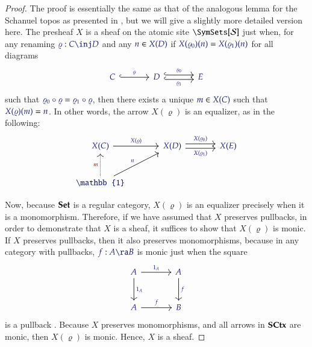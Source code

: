 \documentclass[11pt]{article}
\theoremstyle{definition}
\theoremstyle{remark}
\numberwithin{equation}{section}
\newcommand\SCtxSite{\SymSets[\Sorts]}
\begin{document}
\begin{proof}

  The proof is essentially the same as that of the analogous lemma for the
  Schanuel topos as presented in \cite[A.2.1.11.h]{johnstone:2002}, but we will
  give a slightly more detailed version here. The presheaf $X$ is a sheaf on the
  atomic site $\SCtxSite$ just when, for any renaming
  $\Of{\varrho}{C\inj D}$ and any $\Member{n}{X(D)}$ if
  $\IsEq{X(\varrho_0)(n)}{X(\varrho_1)(n)}$ for all diagrams
  \[
    \begin{tikzcd}[sep=large]
      \IMode{C} \arrow[r, hook, "\IMode{\varrho}"] &
      \IMode{D}
        \arrow[r, hook, shift left, "\IMode{\varrho_0}"]
        \arrow[r, hook, swap, shift right, "\IMode{\varrho_1}"]
      &
      \IMode{E}
    \end{tikzcd}
  \]
  such that $\IsEq{\varrho_0\circ\varrho}{\varrho_1\circ\varrho}$, then there
  exists a unique $\Member{m}{X(C)}$ such that $\IsEq{X(\varrho)(m)}{n}$. In other
  words, the arrow $X(\varrho)$ is an equalizer, as in the following:
  \[
    \begin{tikzcd}[sep=large]
      \IMode{X(C)} \arrow[r, "\IMode{X(\varrho)}"] &
      \IMode{X(D)}
        \arrow[r, shift left, "\IMode{X(\varrho_0)}"]
        \arrow[r, swap, shift right, "\IMode{X(\varrho_1)}"]&
      \IMode{X(E)}
      \\
      \IMode{\mathbb{1}}
        \arrow[u, densely dotted, "\OMode{m}"]
        \arrow[ur, "\IMode{n}"]
    \end{tikzcd}
  \]

  Now, because $\mathbf{Set}$ is a regular category, $X(\varrho)$ is an equalizer
  precisely when it is a monomorphism. Therefore, if we have assumed that $X$
  preserves pullbacks, in order to demonstrate that $X$ is a sheaf, it suffices
  to show that $X(\varrho)$ is monic. If $X$ preserves pullbacks, then it also
  preserves monomorphisms, because in any category with pullbacks, $\Of{f}{A\ra
  B}$ is monic just when the square
  \[
    \begin{tikzcd}[sep=large]
      \IMode{A}
        \arrow[r, "\IMode{\ArrId{A}}"]
        \arrow[d, "\IMode{\ArrId{A}}"] &
      \IMode{A} \arrow[d, "\IMode{f}"]\\
      \IMode{A} \arrow[r, "\IMode{f}"] &
      \IMode{B}
    \end{tikzcd}
  \]
  is a pullback \cite[p.\ 16]{mac-lane-moerdijk:1992}. Because $X$ preserves
  monomorphisms, and all arrows in $\mathbf{SCtx}$ are monic, then $X(\varrho)$ is
  monic. Hence, $X$ is a sheaf.


\end{proof}
\end{document}

